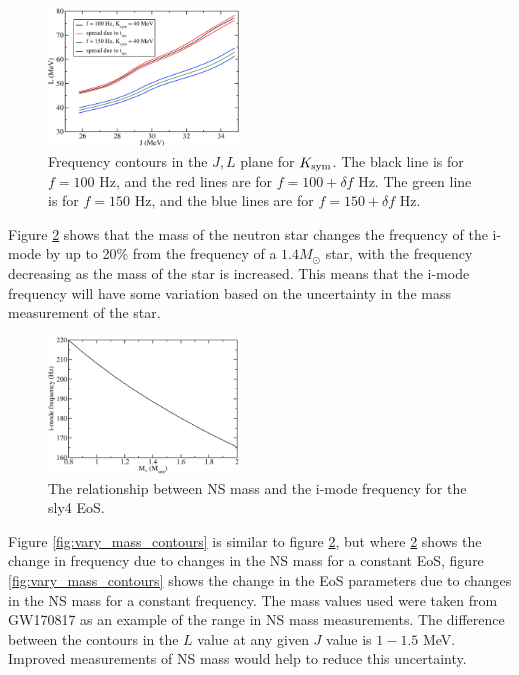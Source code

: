 \documentclass[fleqn,usenatbib]{mnras}
\begin{document}
\begin{figure}
\centering
\includegraphics[width=0.45\textwidth,angle=0]{tres_range_comp.pdf}
\caption{Frequency contours in the $J,L$ plane for $K_{\rm sym}$. The black line is for $f=100$ Hz, and the red lines are for $f=100+\delta f$ Hz. The green line is for $f=150$ Hz, and the blue lines are for $f=150+\delta f$ Hz.}
\label{fig:t_res_spread}
\end{figure}

\hspace{\parindent}Figure \ref{fig:M_vs_f} shows that the mass of the neutron star changes the frequency of the i-mode by up to 20\% from the frequency of a $1.4 M_{\odot}$ star, with the frequency decreasing as the mass of the star is increased. This means that the i-mode frequency will have some variation based on the uncertainty in the mass measurement of the star.%

\begin{figure}
\centering
\includegraphics[width=0.45\textwidth,angle=0]{M_vs_f}
\caption{The relationship between NS mass and the i-mode frequency for the sly4 EoS.}
\label{fig:M_vs_f}
\end{figure}

\hspace{\parindent}Figure \ref{fig:vary_mass_contours} is similar to figure \ref{fig:M_vs_f}, but where \ref{fig:M_vs_f} shows the change in frequency due to changes in the NS mass for a constant EoS, figure \ref{fig:vary_mass_contours} shows the change in the EoS parameters due to changes in the NS mass for a constant frequency. The mass values used were taken from GW170817 as an example of the range in NS mass measurements. The difference between the contours in the $L$ value at any given $J$ value is $1-1.5$ MeV. Improved measurements of NS mass would help to reduce this uncertainty.
\end{document}
